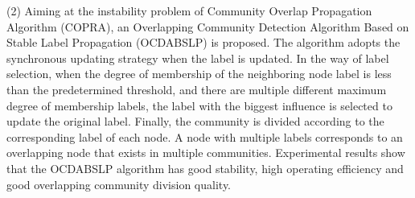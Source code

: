 \begin{englishabstract}
(2) Aiming at the instability problem of Community Overlap Propagation Algorithm (COPRA), an Overlapping Community Detection Algorithm Based on Stable Label Propagation (OCDABSLP) is proposed. The algorithm adopts the synchronous updating strategy when the label is updated. In the way of label selection, when the degree of membership of the neighboring node label is less than the predetermined threshold, and there are multiple different maximum degree of membership labels, the label with the biggest influence is selected to update the original label.  Finally, the community is divided according to the corresponding label of each node. A node with multiple labels corresponds to an overlapping node that exists in multiple communities. Experimental results show that the OCDABSLP algorithm has good stability, high operating efficiency and good overlapping community division quality.


\end{englishabstract}
